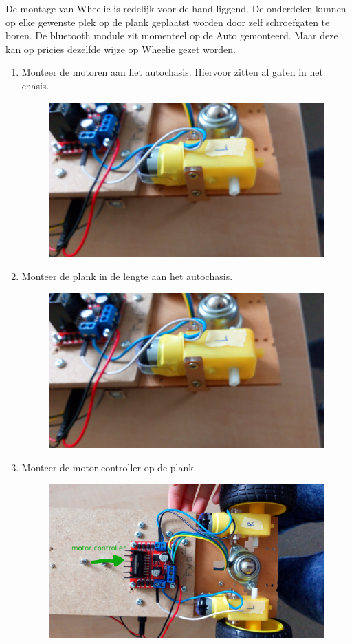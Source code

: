 \documentclass[12pt,a4paper]{article}
\begin{document}
De montage van Wheelie is redelijk voor de hand liggend. De onderdelen kunnen op elke gewenste plek op de plank geplaatst worden door zelf schroefgaten te boren. De bluetooth module zit momenteel op de Auto gemonteerd. Maar deze kan op pricies dezelfde wijze op Wheelie gezet worden. 
\begin{enumerate}
	\item Monteer de motoren aan het autochasis. Hiervoor zitten al gaten in het chasis.
	\begin{figure}[H]
		\centering
		\includegraphics[width=0.7\linewidth]{vastzetten_motor}
		\label{fig:vastzetten_motor}
	\end{figure}
	\item Monteer de plank in de lengte aan het autochasis.
	\begin{figure}[H]
		\centering
		\includegraphics[width=0.7\linewidth]{vastzetten_motor}
		\label{fig:vastzetten_plank}
	\end{figure}
	\item Monteer de motor controller op de plank. 
		\begin{figure}[H]
			\centering
			\includegraphics[width=0.7\linewidth]{vastzetten_motorcontroller}

\end{figure}
\end{enumerate}
\end{document}
